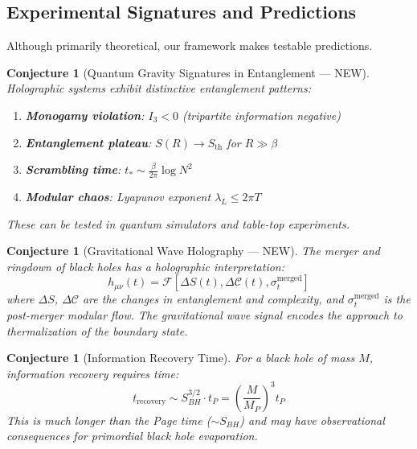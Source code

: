 \documentclass[12pt,a4paper]{article}
\newtheorem{conjecture}[theorem]{Conjecture}
\begin{document}
\subsection{Experimental Signatures and Predictions}

Although primarily theoretical, our framework makes testable predictions.

\begin{conjecture}[Quantum Gravity Signatures in Entanglement --- NEW]
Holographic systems exhibit distinctive entanglement patterns:
\begin{enumerate}
    \item \textbf{Monogamy violation}: $I_3 < 0$ (tripartite information negative)
    \item \textbf{Entanglement plateau}: $S(R) \to S_{\text{th}}$ for $R \gg \beta$
    \item \textbf{Scrambling time}: $t_* \sim \frac{\beta}{2\pi} \log N^2$
    \item \textbf{Modular chaos}: Lyapunov exponent $\lambda_L \leq 2\pi T$
\end{enumerate}
These can be tested in quantum simulators and table-top experiments.
\end{conjecture}

\begin{conjecture}[Gravitational Wave Holography --- NEW]
The merger and ringdown of black holes has a holographic interpretation:
\begin{equation}
h_{\mu\nu}(t) = \mathcal{F}\left[ \Delta S(t), \Delta \mathcal{C}(t), \sigma_t^{\text{merged}} \right]
\end{equation}
where $\Delta S$, $\Delta \mathcal{C}$ are the changes in entanglement and complexity, and $\sigma_t^{\text{merged}}$ is the post-merger modular flow. The gravitational wave signal encodes the approach to thermalization of the boundary state.
\end{conjecture}

\begin{conjecture}[Information Recovery Time]
For a black hole of mass $M$, information recovery requires time:
\begin{equation}
t_{\text{recovery}} \sim S_{BH}^{3/2} \cdot t_P = \left( \frac{M}{M_P} \right)^3 t_P
\end{equation}
This is much longer than the Page time ($\sim S_{BH}$) and may have observational consequences for primordial black hole evaporation.
\end{conjecture}
\end{document}
